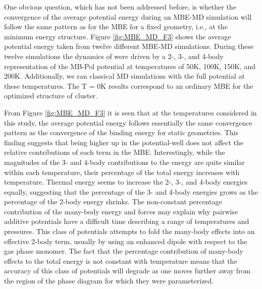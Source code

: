 \documentclass[11pt, proquest]{uwthesis}[2020/02/24]
\let\ce\ch
\begin{document}


\par One obvious question, which has not been addressed before, is whether the convergence of the average potential energy during an MBE-MD simulation will follow the same pattern as for the MBE for a fixed geometry, i.e., at the minimum energy structure. Figure \ref{fig:MBE_MD_F3} shows the average potential energy taken from twelve different MBE-MD simulations. During these twelve simulations the dynamics of \ce{(H2O)_{10}} were driven by a 2-, 3-, and 4-body representation of the MB-Pol potential at temperatures of 50K, 100K, 150K, and 200K. Additionally, we ran classical MD simulations with the full potential at these temperatures. The T = 0K results correspond to an ordinary MBE for the optimized structure of \ce{(H2O)_{10}} cluster.

\par From Figure \ref{fig:MBE_MD_F3} it is seen that at the temperatures considered in this study, the average potential energy follows essentially the same convergence pattern as the convergence of the binding energy for static geometries. This finding suggests that being higher up in the potential-well does not affect the relative contributions of each term in the MBE. Interestingly, while the magnitudes of the 3- and 4-body contributions to the energy are quite similar within each temperature, their percentage of the total energy increases with temperature. Thermal energy seems to increase the 2-, 3-, and 4-body energies equally, suggesting that the percentage of the 3- and 4-body energies grows as the percentage of the 2-body energy shrinks. The non-constant percentage contribution of the many-body energy and forces may explain why pairwise additive potentials have a difficult time describing a range of temperatures and pressures. This class of potentials attempts to fold the many-body effects into an effective 2-body term, usually by using an enhanced dipole with respect to the gas phase monomer. The fact that the percentage contribution of many-body effects to the total energy is not constant with temperature means that the accuracy of this class of potentials will degrade as one moves further away from the region of the phase diagram for which they were parameterized.


\end{document}
